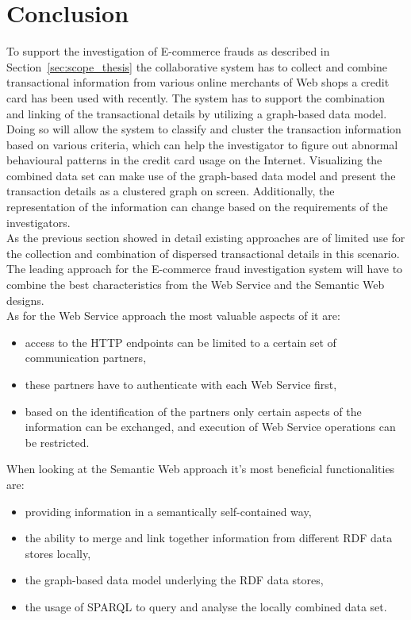
\section{Conclusion}
\label{sec:concept_conclusion}

To support the investigation of \gls{E-commerce} frauds as described in Section~\ref{sec:scope_thesis} the collaborative system has to collect and combine transactional information from various online merchants of Web shops a credit card has been used with recently. The system has to support the combination and linking of the transactional details by utilizing a graph-based data model. Doing so will allow the system to classify and cluster the transaction information based on various criteria, which can help the investigator to figure out abnormal behavioural patterns in the credit card usage on the Internet. Visualizing the combined data set can make use of the graph-based data model and present the transaction details as a clustered graph on screen. Additionally, the representation of the information can change based on the requirements of the investigators. \\

As the previous section showed in detail existing approaches are of limited use for the collection and combination of dispersed transactional details in this scenario. The leading approach for the \gls{E-commerce} fraud investigation system will have to combine the best characteristics from the Web Service and the Semantic Web designs. \\

As for the Web Service approach the most valuable aspects of it are: \@

\begin{itemize}
	\item access to the \gls{HTTP} endpoints can be limited to a certain set of communication partners,
	\item these partners have to authenticate with each Web Service first,
	\item based on the identification of the partners only certain aspects of the information can be exchanged, and execution of Web Service operations can be restricted.
\end{itemize}

When looking at the Semantic Web approach it's most beneficial functionalities are: \@

\begin{itemize}
	\item providing information in a semantically self-contained way,
	\item the ability to merge and link together information from different \gls{RDF} data stores locally,
	\item the graph-based data model underlying the \gls{RDF} data stores,
	\item the usage of \gls{SPARQL} to query and analyse the locally combined data set.
\end{itemize}

